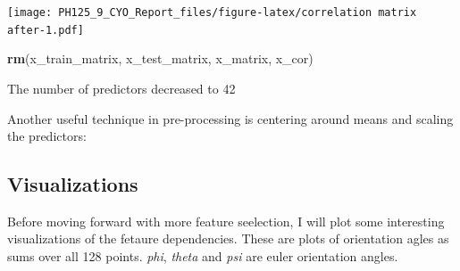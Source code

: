 \documentclass[]{article}
\newenvironment{Shaded}{\begin{snugshade}}{\end{snugshade}}
\newcommand{\CommentTok}[1]{\textcolor[rgb]{0.56,0.35,0.01}{\textit{#1}}}
\newcommand{\DataTypeTok}[1]{\textcolor[rgb]{0.13,0.29,0.53}{#1}}
\newcommand{\DecValTok}[1]{\textcolor[rgb]{0.00,0.00,0.81}{#1}}
\newcommand{\KeywordTok}[1]{\textcolor[rgb]{0.13,0.29,0.53}{\textbf{#1}}}
\newcommand{\NormalTok}[1]{#1}
\newcommand{\OperatorTok}[1]{\textcolor[rgb]{0.81,0.36,0.00}{\textbf{#1}}}
\newcommand{\StringTok}[1]{\textcolor[rgb]{0.31,0.60,0.02}{#1}}
\begin{document}
\texttt{[image: PH125\_9\_CYO\_Report\_files/figure-latex/correlation matrix after-1.pdf]}

\begin{Shaded}
\begin{Highlighting}[]
\KeywordTok{rm}\NormalTok{(x_train_matrix, x_test_matrix, x_matrix, x_cor)}
\end{Highlighting}
\end{Shaded}

The number of predictors decreased to 42

Another useful technique in pre-processing is centering around means and
scaling the predictors:

\begin{Shaded}
\end{Shaded}

\hypertarget{visualizations}{%
\subsection{Visualizations}\label{visualizations}}

Before moving forward with more feature seelection, I will plot some
interesting visualizations of the fetaure dependencies. These are plots
of orientation agles as sums over all 128 points. \emph{phi},
\emph{theta} and \emph{psi} are euler orientation angles.

\begin{Shaded}
\end{Shaded}
\end{document}
